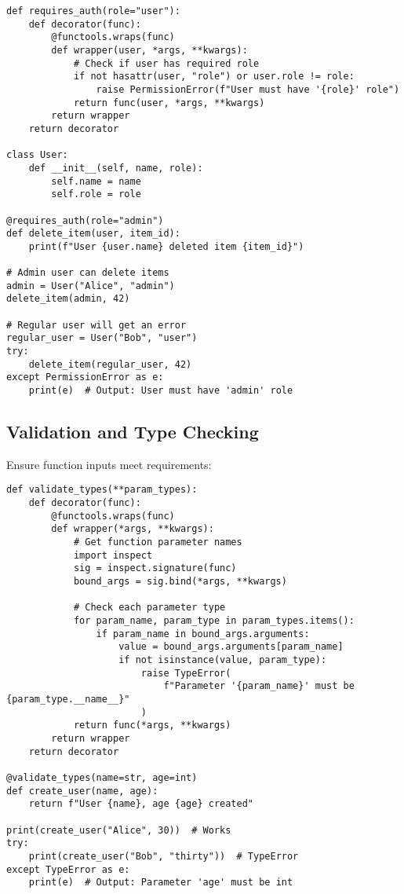 \documentclass[12pt,letterpaper]{article}
\newenvironment{macterminal}{%
    \begin{mdframed}[
        linecolor=terminalFrame,
        backgroundcolor=terminalBg,
        roundcorner=5pt,
        skipabove=10pt,
        skipbelow=10pt,
        linewidth=1pt,
        innertopmargin=10pt, %
        frametitle={%
            \tikz[baseline=(current bounding box.east), outer sep=0pt]{
                \fill[red!80!black] (0,0) circle (5pt);
                \fill[yellow!80!black] (0.7,0) circle (5pt);
                \fill[green!70!black] (1.4,0) circle (5pt);
            }
        },
        frametitlealignment=\raggedright, %
        frametitleaboveskip=8pt, %
        frametitlebelowskip=0pt, %
    ]
}{%
    \end{mdframed}%
}
\begin{document}
\begin{macterminal}
\begin{lstlisting}
def requires_auth(role="user"):
    def decorator(func):
        @functools.wraps(func)
        def wrapper(user, *args, **kwargs):
            # Check if user has required role
            if not hasattr(user, "role") or user.role != role:
                raise PermissionError(f"User must have '{role}' role")
            return func(user, *args, **kwargs)
        return wrapper
    return decorator

class User:
    def __init__(self, name, role):
        self.name = name
        self.role = role

@requires_auth(role="admin")
def delete_item(user, item_id):
    print(f"User {user.name} deleted item {item_id}")

# Admin user can delete items
admin = User("Alice", "admin")
delete_item(admin, 42)

# Regular user will get an error
regular_user = User("Bob", "user")
try:
    delete_item(regular_user, 42)
except PermissionError as e:
    print(e)  # Output: User must have 'admin' role
\end{lstlisting}
\end{macterminal}

\subsection{Validation and Type Checking}

Ensure function inputs meet requirements:

\begin{macterminal}
\begin{lstlisting}
def validate_types(**param_types):
    def decorator(func):
        @functools.wraps(func)
        def wrapper(*args, **kwargs):
            # Get function parameter names
            import inspect
            sig = inspect.signature(func)
            bound_args = sig.bind(*args, **kwargs)
            
            # Check each parameter type
            for param_name, param_type in param_types.items():
                if param_name in bound_args.arguments:
                    value = bound_args.arguments[param_name]
                    if not isinstance(value, param_type):
                        raise TypeError(
                            f"Parameter '{param_name}' must be {param_type.__name__}"
                        )
            return func(*args, **kwargs)
        return wrapper
    return decorator

@validate_types(name=str, age=int)
def create_user(name, age):
    return f"User {name}, age {age} created"

print(create_user("Alice", 30))  # Works
try:
    print(create_user("Bob", "thirty"))  # TypeError
except TypeError as e:
    print(e)  # Output: Parameter 'age' must be int
\end{lstlisting}
\end{macterminal}
\end{document}
